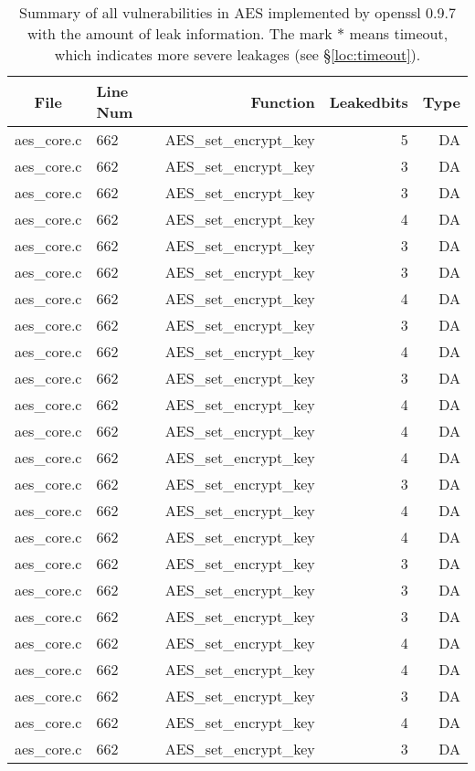 \begin{table}%
\centering\tiny
\caption{Summary of all vulnerabilities in AES implemented by openssl 0.9.7 with the amount of leak information. The mark $*$ means timeout, which indicates more severe leakages (see \S\ref{loc:timeout}).}\label{tab:AESopenssl}
\begin{tabular}{clrrr}
\hline
\textbf{File} & \textbf{Line Num} & \textbf{Function} & \textbf{Leakedbits} & \textbf{Type} \\\hline
aes\_core.c& 662&AES\_set\_encrypt\_key&5 &DA\\
aes\_core.c& 662&AES\_set\_encrypt\_key&3 &DA\\
aes\_core.c& 662&AES\_set\_encrypt\_key&3 &DA\\
aes\_core.c& 662&AES\_set\_encrypt\_key&4 &DA\\
aes\_core.c& 662&AES\_set\_encrypt\_key&3 &DA\\
aes\_core.c& 662&AES\_set\_encrypt\_key&3 &DA\\
aes\_core.c& 662&AES\_set\_encrypt\_key&4 &DA\\
aes\_core.c& 662&AES\_set\_encrypt\_key&3 &DA\\
aes\_core.c& 662&AES\_set\_encrypt\_key&4 &DA\\
aes\_core.c& 662&AES\_set\_encrypt\_key&3 &DA\\
aes\_core.c& 662&AES\_set\_encrypt\_key&4 &DA\\
aes\_core.c& 662&AES\_set\_encrypt\_key&4 &DA\\
aes\_core.c& 662&AES\_set\_encrypt\_key&4 &DA\\
aes\_core.c& 662&AES\_set\_encrypt\_key&3 &DA\\
aes\_core.c& 662&AES\_set\_encrypt\_key&4 &DA\\
aes\_core.c& 662&AES\_set\_encrypt\_key&4 &DA\\
aes\_core.c& 662&AES\_set\_encrypt\_key&3 &DA\\
aes\_core.c& 662&AES\_set\_encrypt\_key&3 &DA\\
aes\_core.c& 662&AES\_set\_encrypt\_key&3 &DA\\
aes\_core.c& 662&AES\_set\_encrypt\_key&4 &DA\\
aes\_core.c& 662&AES\_set\_encrypt\_key&4 &DA\\
aes\_core.c& 662&AES\_set\_encrypt\_key&3 &DA\\
aes\_core.c& 662&AES\_set\_encrypt\_key&4 &DA\\
aes\_core.c& 662&AES\_set\_encrypt\_key&3 &DA\\

\end{tabular}
\end{table}
